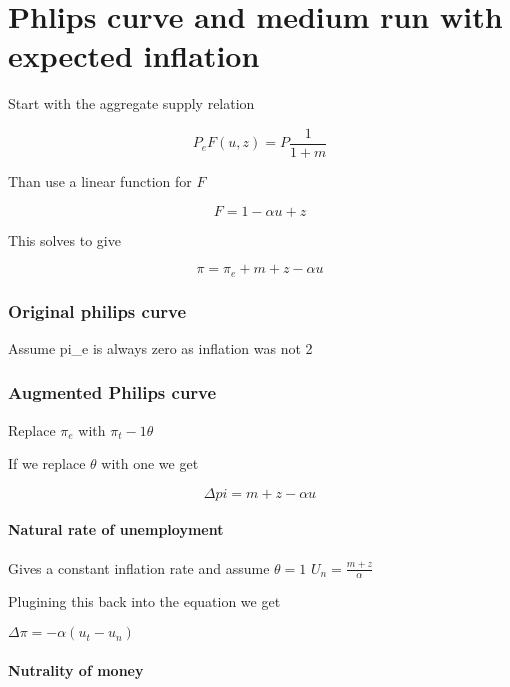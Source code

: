 \documentclass[,twocolumn]{article}
\let\oldparagraph\paragraph
\renewcommand{\paragraph}[1]{\oldparagraph{#1}\mbox{}}
\begin{document}
\hypertarget{phlips-curve-and-medium-run-with-expected-inflation}{%
\section{Phlips curve and medium run with expected
inflation}\label{phlips-curve-and-medium-run-with-expected-inflation}}

Start with the aggregate supply relation

\[P_e F(u,z) = P \frac{1}{1+m}\]

Than use a linear function for \(F\)

\[F = 1-\alpha u + z\]

This solves to give

\[\pi = \pi_e + m + z -\alpha u\]

\hypertarget{original-philips-curve}{%
\subsubsection{Original philips curve}\label{original-philips-curve}}

Assume pi\_e is always zero as inflation was not 2

\hypertarget{augmented-philips-curve}{%
\subsubsection{Augmented Philips curve}\label{augmented-philips-curve}}

Replace \(\pi_e\) with \(\pi_t-1 \theta\)

If we replace \(\theta\) with one we get

\[\Delta pi = m + z -\alpha u\]

\hypertarget{natural-rate-of-unemployment}{%
\paragraph{Natural rate of
unemployment}\label{natural-rate-of-unemployment}}

Gives a constant inflation rate and assume \(\theta = 1\)
\(U_n = \frac{m+z}{\alpha}\)

Plugining this back into the equation we get

\(\Delta \pi = -\alpha (u_t - u_n)\)

\hypertarget{nutrality-of-money}{%
\paragraph{Nutrality of money}\label{nutrality-of-money}}
\end{document}
